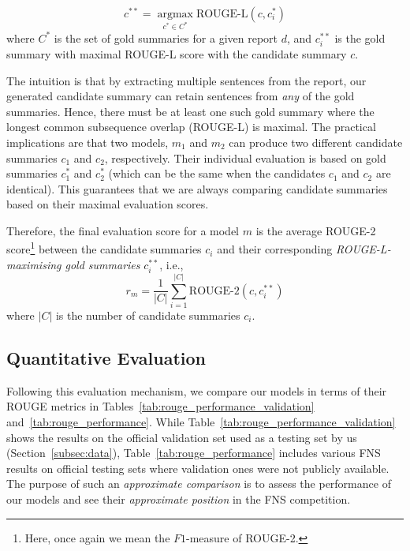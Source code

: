 \begin{equation}\label{eq:rouge_max}
    c^{**} = \underset{c^{*} \in C^{*}}{\operatorname{argmax}} \text{ROUGE-L}(c, c^{*}_{i})
\end{equation}
where $C^{*}$ is the set of gold summaries for a given report $d$, and $c^{**}_{i}$ is the gold summary with maximal ROUGE-L score with the candidate summary $c$.

The intuition is that by extracting multiple sentences from the report, our generated candidate summary can
retain sentences from \emph{any} of the gold summaries.
Hence, there must be at least one such gold summary where the longest common subsequence overlap (ROUGE-L) is maximal.
The practical implications are that two models, $m_{1}$ and $m_{2}$ can produce two different candidate summaries
$c_{1}$ and $c_{2}$, respectively.
Their individual evaluation is based on gold summaries $c^{*}_{1}$ and $c^{*}_{2}$ (which can be the same when the
candidates $c_{1}$ and $c_{2}$ are identical).
This guarantees that we are always comparing candidate summaries based on their maximal evaluation scores.

Therefore, the final evaluation score for a model $m$ is the average ROUGE-2 score\footnote{
    Here, once again we mean the $F1$-measure of ROUGE-2.
} between the candidate summaries $c_{i}$ and their corresponding \emph{ROUGE-L-maximising gold summaries} $c^{**}_{i}$, i.e.,
\begin{equation}\label{eq:rouge_final}
    r_{m} = \frac{1}{|C|} \sum_{i=1}^{|C|} \text{ROUGE-2}(c, c^{**}_{i})
\end{equation}
where $|C|$ is the number of candidate summaries $c_{i}$.

\subsection{Quantitative Evaluation}\label{subsec:quantitative-evaluation}
Following this evaluation mechanism, we compare our models in terms of their ROUGE metrics in Tables~\ref{tab:rouge_performance_validation} and~\ref{tab:rouge_performance}.
While Table~\ref{tab:rouge_performance_validation} shows the results on the official validation set used as a testing set by us (Section~\ref{subsec:data}),
Table~\ref{tab:rouge_performance} includes various FNS results on official testing sets where validation ones were not publicly available.
The purpose of such an \emph{approximate comparison} is to assess the performance of our models and see their \emph{approximate position} in the FNS competition.



